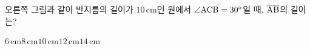 \noindent\begin{minipage}[t]{0.58\linewidth}\vspace{0pt}\raggedright 오른쪽 그림과 같이 반지름의 길이가 $10\,\mathrm{cm}$인 원에서 $\angle\mathrm{ACB}=30^\circ$일 때, $\overline{\mathrm{AB}}$의 길이는?\end{minipage}\hfill\begin{minipage}[t]{0.4\linewidth}\vspace{0pt}\centering \resizebox{\ifdim\width>\linewidth\linewidth\else\width\fi}{!}{}\end{minipage}\par
\begin{choicesii}{$6\,\mathrm{cm}$}{$8\,\mathrm{cm}$}{$10\,\mathrm{cm}$}{$12\,\mathrm{cm}$}{$14\,\mathrm{cm}$}\end{choicesii}

